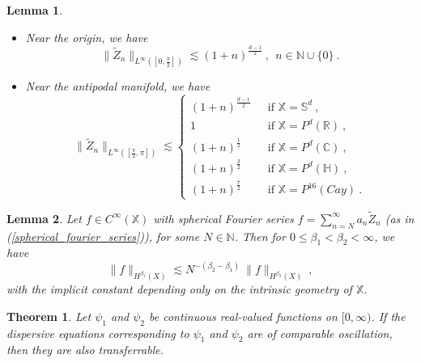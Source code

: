 \documentclass[10pt,a4paper]{amsart}
\newtheorem{theorem}{Theorem}
\newtheorem{lemma}{Lemma}
\newcommand{\C}{\mathbb C}%
\newcommand{\Hb}{\mathbb H}%
\newcommand{\N}{\mathbb N}%
\newcommand{\R}{\mathbb R}%
\newcommand{\Sb}{\mathbb S}%
\newcommand{\X}{\mathbb X}%
\begin{document}
\begin{lemma} \label{Linfty_bound}
\begin{itemize}
\item[(i)] Near the origin, we have
 \begin{equation*}
 \|\tilde{Z}_n\|_{L^\infty\left(\left[0,\frac{\pi}{2}\right]\right)} \lesssim {\left(1+n\right)}^{\frac{d-1}{2}}\:,\:\: n \in \N \cup \{0\}\:.
\end{equation*}  
\item[(ii)] Near the antipodal manifold, we have
\begin{equation*}
\|\tilde{Z}_n\|_{L^\infty\left(\left[\frac{\pi}{2},\pi\right]\right)} \lesssim \begin{cases}
(1+n)^{\frac{d-1}{2}}\:\:\:&\text{if } \X=\Sb^d\:,\\
1\:\:\:&\text{if } \X=P^d(\R)\:,\\
(1+n)^{\frac{1}{2}}\:\:\:&\text{if } \X=P^d(\C)\:,\\
(1+n)^{\frac{3}{2}}\:\:\:&\text{if } \X=P^d(\Hb)\:,\\
(1+n)^{\frac{7}{2}}\:\:\:&\text{if } \X=P^{16}(Cay)\:.
\end{cases}
\end{equation*}
\end{itemize}
\end{lemma}

\begin{lemma} \label{sobolev_comparison}
Let $f \in C^\infty(\X)$ with spherical Fourier series $f=\displaystyle\sum_{n=N}^\infty a_n \tilde{Z}_n$ (as in (\ref{spherical_fourier_series})), for some $N \in \N$. Then for $0 \le \beta_1 < \beta_2 < \infty$, we have
\begin{equation*}
\|f\|_{H^{\beta_1}(X)} \lesssim N^{-(\beta_2-\beta_1)}\:\|f\|_{H^{\beta_2}(X)}\:,
\end{equation*}
with the implicit constant depending only on the intrinsic geometry of $\X$.
\end{lemma}

\begin{theorem} \label{transference_principle}
Let $\psi_1$ and $\psi_2$ be continuous real-valued functions on $[0,\infty)$. If the dispersive equations corresponding to $\psi_1$ and $\psi_2$ are of comparable oscillation, then they are also transferrable.  
\end{theorem} 
\end{document}
